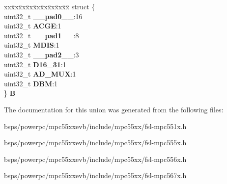 \begin{DoxyCompactItemize}
\begin{tabbing}
\end{tabbing}\item 
\mbox{\label{unionEBI__tag_1_1EBI__MCR__tag_a892fbd6266a1ef927839f8f16e244fa6}} 
\begin{tabbing}
xx\=xx\=xx\=xx\=xx\=xx\=xx\=xx\=xx\=\kill
struct \{\\
\>uint32\_t {\bfseries \_\_pad0\_\_}:16\\
\>uint32\_t {\bfseries ACGE}:1\\
\>uint32\_t {\bfseries \_\_pad1\_\_}:8\\
\>uint32\_t {\bfseries MDIS}:1\\
\>uint32\_t {\bfseries \_\_pad2\_\_}:3\\
\>uint32\_t {\bfseries D16\_31}:1\\
\>uint32\_t {\bfseries AD\_MUX}:1\\
\>uint32\_t {\bfseries DBM}:1\\
\} {\bfseries B}\\

\end{tabbing}\end{DoxyCompactItemize}


The documentation for this union was generated from the following files\+:\begin{DoxyCompactItemize}
\item 
bsps/powerpc/mpc55xxevb/include/mpc55xx/fsl-\/mpc551x.\+h\item 
bsps/powerpc/mpc55xxevb/include/mpc55xx/fsl-\/mpc555x.\+h\item 
bsps/powerpc/mpc55xxevb/include/mpc55xx/fsl-\/mpc556x.\+h\item 
bsps/powerpc/mpc55xxevb/include/mpc55xx/fsl-\/mpc567x.\+h\end{DoxyCompactItemize}
